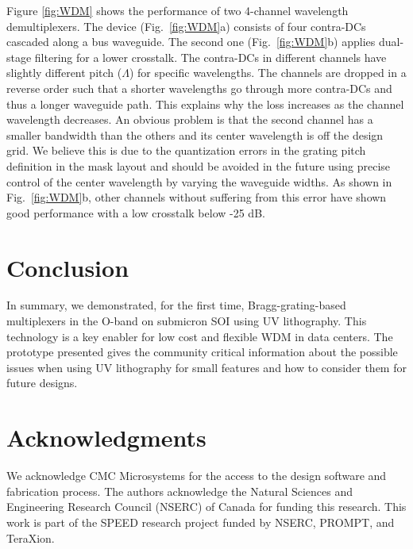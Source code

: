 \documentclass[letterpaper,10pt]{article}
\begin{document}
Figure \ref{fig:WDM} shows the performance of two 4-channel wavelength demultiplexers. The device (Fig.~\ref{fig:WDM}a) consists of four contra-DCs cascaded along a bus waveguide. 
The second one (Fig.~\ref{fig:WDM}b) applies dual-stage filtering for a lower crosstalk. The contra-DCs in different channels have slightly different pitch ($\Lambda$) for specific wavelengths. The channels are dropped in a reverse order such that a shorter wavelengths go through more contra-DCs and thus a longer waveguide path. This explains why the loss increases as the channel wavelength decreases. An obvious problem is that the second channel has a smaller bandwidth than the others and its center wavelength is off the design grid. 
We believe this is due to the quantization errors in the grating pitch definition in the mask layout and should be avoided in the future using precise control of the center wavelength by varying the waveguide widths. As shown in Fig.~\ref{fig:WDM}b, other channels without suffering from this error have shown good performance with a low crosstalk below -25 dB. 

\section{Conclusion}
In summary, we demonstrated, for the first time, Bragg-grating-based multiplexers in the O-band on submicron SOI using UV lithography. This technology is a key enabler for low cost and flexible WDM in data centers. 
The prototype presented gives the community critical information about the possible issues when using UV lithography for small features and how to consider them for future designs.

\section*{Acknowledgments}
We acknowledge CMC Microsystems for the access to the design software and fabrication process. The authors acknowledge the Natural Sciences and Engineering Research Council (NSERC) of Canada for funding this research. This work is part of the SPEED research project funded by NSERC, PROMPT, and TeraXion.



\end{document}
